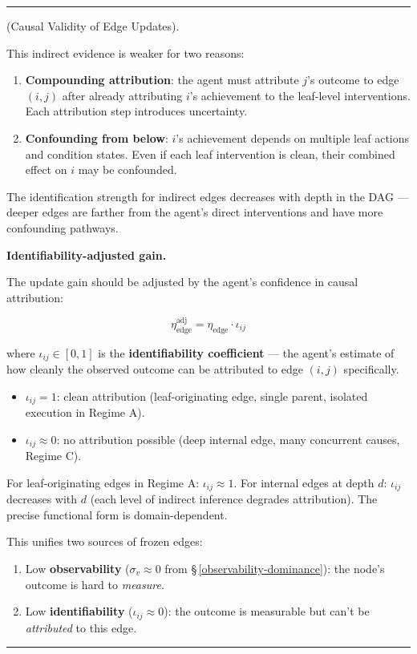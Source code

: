 \documentclass[11pt,oneside]{article}
\newcounter{claim}[section]
\renewcommand{\theclaim}{\thesection.\arabic{claim}}
\newenvironment{segment}[2]{%
  \refstepcounter{claim}%
  \bigskip\noindent\hrule\smallskip
  \noindent{\bfseries #1~\theclaim}\enskip(#2).\par\smallskip
  \noindent\ignorespaces
}{%
  \par\smallskip\noindent\hrule\bigskip
}
\newenvironment{scope}[1][]{\begin{segment}{Scope}{#1}}{\end{segment}}
\begin{document}
\begin{scope}[Causal Validity of Edge Updates]
This indirect evidence is weaker for two reasons:
\begin{enumerate}
  \item \textbf{Compounding attribution}: the agent must attribute $j$'s outcome to edge $(i, j)$ after already attributing $i$'s achievement to the leaf-level interventions. Each attribution step introduces uncertainty.
  \item \textbf{Confounding from below}: $i$'s achievement depends on multiple leaf actions and condition states. Even if each leaf intervention is clean, their combined effect on $i$ may be confounded.
\end{enumerate}


The identification strength for indirect edges decreases with depth in the DAG — deeper edges are farther from the agent's direct interventions and have more confounding pathways.


\medskip\noindent\textbf{Identifiability-adjusted gain.}



The update gain should be adjusted by the agent's confidence in causal attribution:

$$\eta_{\text{edge}}^{\text{adj}} = \eta_{\text{edge}} \cdot \iota_{ij}$$

where $\iota_{ij} \in [0, 1]$ is the \textbf{identifiability coefficient} — the agent's estimate of how cleanly the observed outcome can be attributed to edge $(i, j)$ specifically.

\begin{itemize}
  \item $\iota_{ij} = 1$: clean attribution (leaf-originating edge, single parent, isolated execution in Regime A).
  \item $\iota_{ij} \approx 0$: no attribution possible (deep internal edge, many concurrent causes, Regime C).
\end{itemize}


For leaf-originating edges in Regime A: $\iota_{ij} \approx 1$. For internal edges at depth $d$: $\iota_{ij}$ decreases with $d$ (each level of indirect inference degrades attribution). The precise functional form is domain-dependent.

This unifies two sources of frozen edges:
\begin{enumerate}
  \item Low \textbf{observability} ($\sigma_v \approx 0$ from \S\,\ref{observability-dominance}): the node's outcome is hard to \textit{measure}.
  \item Low \textbf{identifiability} ($\iota_{ij} \approx 0$): the outcome is measurable but can't be \textit{attributed} to this edge.
\end{enumerate}



\end{scope}
\end{document}
